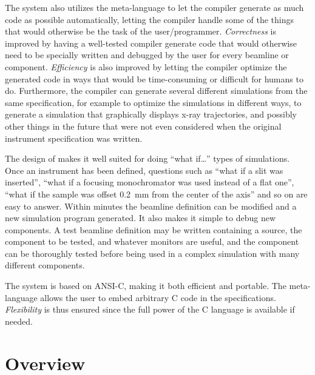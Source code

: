 The \MCX system also utilizes the meta-language to let the \MCX
compiler generate as much code as possible automatically, letting the
compiler handle some of the things that would otherwise be the task of
the user/programmer. \textit{Correctness} is improved by having a well-tested
compiler generate code that would otherwise need to be specially written
and debugged by the user for every beamline or component. \textit{Efficiency}
is also improved by letting the compiler optimize the generated code in
ways that would be time-consuming or difficult for humans to do. Furthermore, the
compiler can generate several different simulations from the same
specification, for example to optimize the simulations in different
ways, to generate a simulation that graphically displays x-ray
trajectories, and possibly other things in the future that were not even
considered when the original instrument specification was written.

The design of \MCX makes it well suited for doing ``what if\ldots''
types of simulations. Once an instrument has been defined, questions
such as ``what if a slit was inserted'', ``what if a focusing
monochromator was used instead of a flat one'', ``what if the sample was
offset 0.2\ mm from the center of the axis'' and so on are easy to answer. Within
minutes the beamline definition can be modified and a
new simulation program generated. It also makes it simple to debug new
components. A test beamline definition may be written
containing a source, the component to be tested, and whatever
monitors are useful, and the component can be thoroughly tested before
being used in a complex simulation with many different components.

The \MCX system is based on ANSI-C, making it both efficient and
portable. The meta-language allows the user to embed arbitrary C code in
the specifications. \textit{Flexibility} is thus ensured since the full
power of the C language is available if needed.


\section{Overview}

